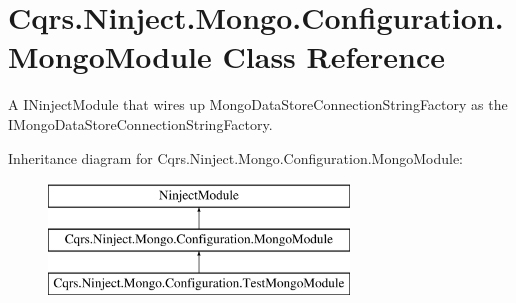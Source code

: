 \hypertarget{classCqrs_1_1Ninject_1_1Mongo_1_1Configuration_1_1MongoModule}{}\section{Cqrs.\+Ninject.\+Mongo.\+Configuration.\+Mongo\+Module Class Reference}
\label{classCqrs_1_1Ninject_1_1Mongo_1_1Configuration_1_1MongoModule}


A I\+Ninject\+Module that wires up Mongo\+Data\+Store\+Connection\+String\+Factory as the I\+Mongo\+Data\+Store\+Connection\+String\+Factory.  


Inheritance diagram for Cqrs.\+Ninject.\+Mongo.\+Configuration.\+Mongo\+Module\+:\begin{figure}[H]
\begin{center}
\leavevmode
\includegraphics[height=3.000000cm]{classCqrs_1_1Ninject_1_1Mongo_1_1Configuration_1_1MongoModule}
\end{center}
\end{figure}
